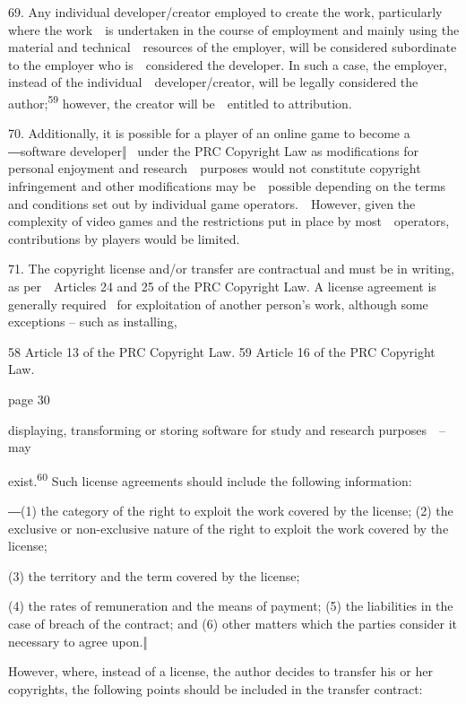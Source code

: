\documentclass[
]{article}
\begin{document}
{69. }{Any individual developer/creator employed to create the work,
particularly where the work~~is undertaken in the course of employment
and mainly using the material and technical~~resources of the employer,
will be considered subordinate to the employer who is~~considered the
developer. In such a case, the employer, instead of the
individual~~developer/creator, will be legally considered the
author;}\textsuperscript{{59 }}{however, the creator will be~~entitled
to attribution.}

{70. }{Additionally, it is possible for a player of an online game to
become a ―software developer‖ }{~under the PRC }{Copyright Law }{as
modifications for personal enjoyment and research~~purposes would not
constitute copyright infringement and other modifications may
be~~possible depending on the terms and conditions set out by individual
game operators.~~However, given the complexity of video games and the
restrictions put in place by most~~operators, contributions by players
would be limited.}

{71. }{The copyright license and/or transfer are contractual and must be
in writing, as per~~Articles 24 and 25 of the PRC }{Copyright Law}{. A
license agreement is generally required }{~for exploitation of another
person's work, although some exceptions -- }{such as installing,}

{58 }{Article 13 of the PRC }{Copyright Law}{. }{59 }{Article 16 of the
PRC }{Copyright Law}{.}

{page 30}

{displaying, transforming or storing software for study and research
purposes~~}{-- }{may}

{exist.}\textsuperscript{{60 }}{Such license agreements should include
the following information:}

{―(1) the category of the right to exploit the work covered by the
license; }{(2) the exclusive or non-exclusive nature of the right to
exploit the work covered by the license;}

{(3) the territory and the term covered by the license;}

{(4) the rates of remuneration and the means of payment; (5) the
liabilities in the case of breach of the contract; and }{(6) other
matters which the parties consider it necessary to agree upon.‖}

{However, where, instead of a license, the author decides to transfer
his or her copyrights, the following points should be included in the
transfer contract:}
\end{document}

